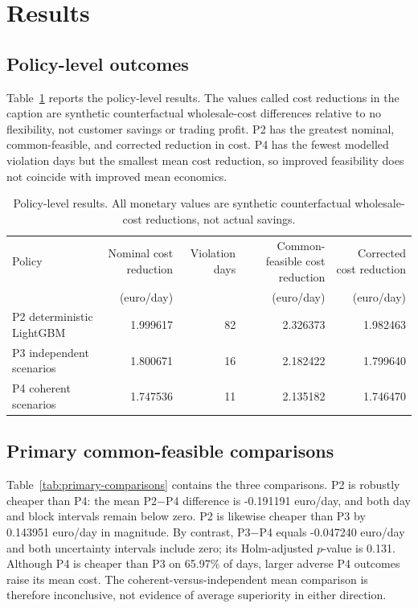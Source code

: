 \documentclass[10pt,twocolumn]{article}
\newcommand{\status}[1]{\texttt{\detokenize{#1}}}
\begin{document}
\section{Results}
\label{sec:results}

\subsection{Policy-level outcomes}

Table~\ref{tab:policy} reports the policy-level results. The values called cost
reductions in the caption are synthetic counterfactual wholesale-cost
differences relative to no flexibility, not customer savings or trading profit.
P2 has the greatest nominal, common-feasible, and corrected reduction in cost.
P4 has the fewest modelled violation days but the smallest mean cost reduction,
so improved feasibility does not coincide with improved mean economics.

\begin{table}[t]
\centering
\caption{Policy-level results. All monetary values are synthetic counterfactual
wholesale-cost reductions, not actual savings.}
\label{tab:policy}
\small
\begin{tabular}{lrrrr}
\toprule
Policy & Nominal cost reduction & Violation days & Common-feasible cost reduction & Corrected cost reduction\\
 & (euro/day) & & (euro/day) & (euro/day)\\
\midrule
P2 deterministic LightGBM & 1.999617 & 82 & 2.326373 & 1.982463\\
P3 independent scenarios & 1.800671 & 16 & 2.182422 & 1.799640\\
P4 coherent scenarios & 1.747536 & 11 & 2.135182 & 1.746470\\
\bottomrule
\end{tabular}
\end{table}

\subsection{Primary common-feasible comparisons}

Table~\ref{tab:primary-comparisons} contains the three
\status{PRE_REGISTERED_PRIMARY} comparisons. P2 is robustly cheaper than P4:
the mean P2$-$P4 difference is -0.191191 euro/day, and both day and block
intervals remain below zero. P2 is likewise cheaper than P3 by 0.143951
euro/day in magnitude. By contrast, P3$-$P4 equals -0.047240 euro/day and both
uncertainty intervals include zero; its Holm-adjusted $p$-value is 0.131.
Although P4 is cheaper than P3 on 65.97\% of days, larger adverse P4 outcomes
raise its mean cost. The coherent-versus-independent mean comparison is
therefore inconclusive, not evidence of average superiority in either direction.
\end{document}

